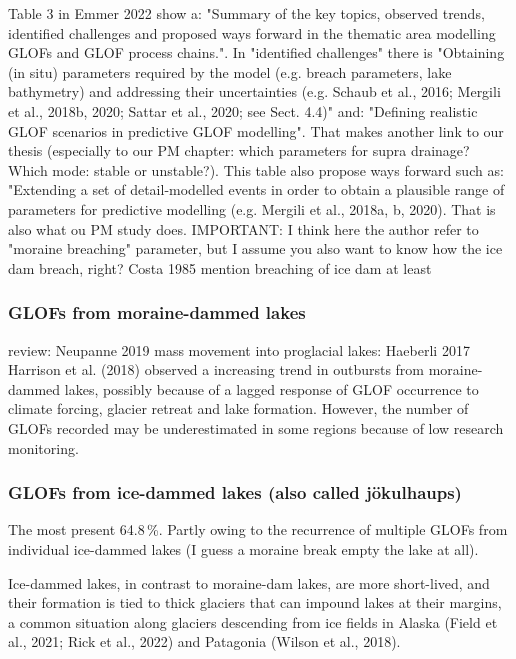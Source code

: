 Table 3 in Emmer 2022 show a: "Summary of the key topics, observed trends, identified challenges and proposed ways forward in the thematic area modelling GLOFs and GLOF process chains.". In "identified challenges" there is "Obtaining (in situ) parameters required by the model (e.g. breach parameters, lake bathymetry) and addressing their uncertainties (e.g. Schaub et al., 2016; Mergili et al., 2018b, 2020; Sattar et al., 2020; see Sect. 4.4)" and: "Defining realistic GLOF scenarios in predictive GLOF modelling". That makes another link to our thesis (especially to our PM chapter: which parameters for supra drainage? Which mode: stable or unstable?). 
This table also propose ways forward such as: "Extending a set of detail-modelled events in order to obtain a plausible range of parameters for predictive modelling (e.g. Mergili et al., 2018a, b, 2020). That is also what ou PM study does.
IMPORTANT: I think here the author refer to "moraine breaching" parameter, but I assume you also want to know how the ice dam breach, right? Costa 1985 mention breaching of ice dam at least

\subsubsection{GLOFs from moraine-dammed lakes}

review: Neupanne 2019
mass movement into proglacial lakes: Haeberli 2017
Harrison et al. (2018) observed a increasing trend in outbursts from moraine-dammed lakes, possibly because of a lagged response of GLOF occurrence to climate forcing, glacier retreat and lake formation. However, the number of GLOFs recorded may
be underestimated in some regions because of low research
monitoring. %

\subsubsection{GLOFs from ice-dammed lakes (also called jökulhaups)}

The most present \citep{Zhang&al2024} 64.8\,\%. Partly owing
to the recurrence of multiple GLOFs from individual ice-dammed lakes (I guess a moraine break empty the lake at all).

Ice-dammed lakes, in contrast to moraine-dam lakes, are more short-lived, and their formation is tied to thick glaciers that can impound lakes at their margins, a common situation along glaciers descending from ice fields in Alaska (Field et al., 2021; Rick et al., 2022) and Patagonia (Wilson et al., 2018). %

